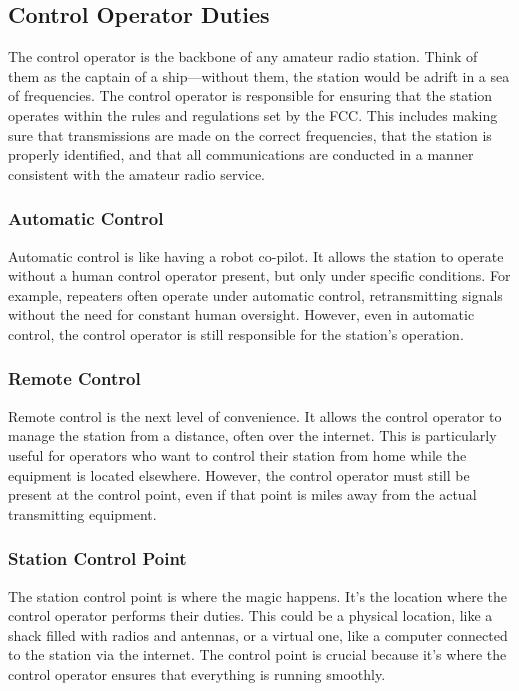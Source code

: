 \subsection{Control Operator Duties}
\label{subsec:control-ops}

The control operator is the backbone of any amateur radio station. Think of them as the captain of a ship—without them, the station would be adrift in a sea of frequencies. The control operator is responsible for ensuring that the station operates within the rules and regulations set by the FCC. This includes making sure that transmissions are made on the correct frequencies, that the station is properly identified, and that all communications are conducted in a manner consistent with the amateur radio service.

\subsubsection*{Automatic Control}
Automatic control is like having a robot co-pilot. It allows the station to operate without a human control operator present, but only under specific conditions. For example, repeaters often operate under automatic control, retransmitting signals without the need for constant human oversight. However, even in automatic control, the control operator is still responsible for the station's operation.

\subsubsection*{Remote Control}
Remote control is the next level of convenience. It allows the control operator to manage the station from a distance, often over the internet. This is particularly useful for operators who want to control their station from home while the equipment is located elsewhere. However, the control operator must still be present at the control point, even if that point is miles away from the actual transmitting equipment.

\subsubsection*{Station Control Point}
The station control point is where the magic happens. It's the location where the control operator performs their duties. This could be a physical location, like a shack filled with radios and antennas, or a virtual one, like a computer connected to the station via the internet. The control point is crucial because it's where the control operator ensures that everything is running smoothly.


